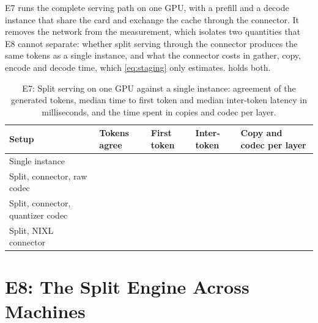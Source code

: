 E7 runs the complete serving path on one GPU, with a prefill and a decode
instance that share the card and exchange the cache through the connector. It
removes the network from the measurement, which isolates two quantities that
E8 cannot separate: whether split serving through the connector produces the
same tokens as a single instance, and what the connector costs in gather,
copy, encode and decode time, which \cref{eq:staging} only estimates.
 holds both.

\begin{table}[htbp]
  \centering
  \caption[E7: Split serving on one GPU against a single instance]{E7: Split serving on one GPU against a single instance: agreement of the generated tokens, median time to first token and median inter-token latency in milliseconds, and the time spent in copies and codec per layer.}
  \label{tab:e7}
  \small
  \begin{tabular}{L{5.2cm}L{2.2cm}L{1.9cm}L{1.9cm}L{2.4cm}}
    \toprule
    Setup & Tokens agree & First token & Inter-token & Copy and codec per layer \\
    \midrule
    Single instance & & & & \\
    Split, connector, raw codec & & & & \\
    Split, connector, quantizer codec & & & & \\
    Split, NIXL connector & & & & \\
    \bottomrule
  \end{tabular}
  \par\smallskip{}
\end{table}


\section{E8: The Split Engine Across Machines}
\label{sec:res-e8}


